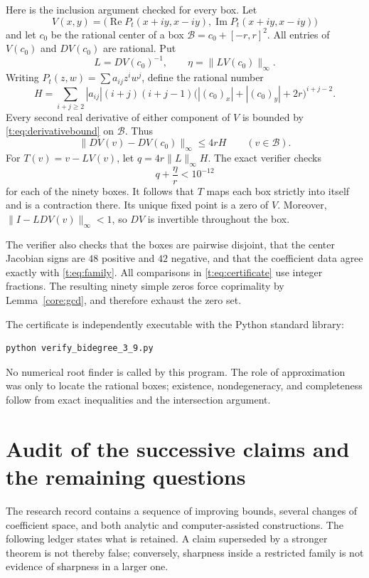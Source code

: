\documentclass[UTF8,11pt]{ctexart}
\theoremstyle{definition}
\numberwithin{equation}{section}
\DeclareMathOperator{\Rea}{Re}\DeclareMathOperator{\Ima}{Im}
\begin{document}
Here is the inclusion argument checked for every box. Let
\[
 V(x,y)=\bigl(\Rea P_t(x+iy,x-iy),\Ima P_t(x+iy,x-iy)\bigr)
\]
and let $c_0$ be the rational center of a box
$\mathcal B=c_0+[-r,r]^2$. All entries of
$V(c_0)$ and $DV(c_0)$ are rational. Put
\[
 L=DV(c_0)^{-1},\qquad
 \eta=\|LV(c_0)\|_\infty.
\]
Writing $P_t(z,w)=\sum a_{ij}z^iw^j$, define the rational number
\begin{equation}\label{t:eq:derivativebound}
 H=\sum_{i+j\ge2}|a_{ij}|(i+j)(i+j-1)
 \bigl(|(c_0)_x|+|(c_0)_y|+2r\bigr)^{i+j-2}.
\end{equation}
Every second real derivative of either component of $V$ is bounded
by \eqref{t:eq:derivativebound} on $\mathcal B$. Thus
\[
 \|DV(v)-DV(c_0)\|_\infty\le4rH\qquad(v\in\mathcal B).
\]
For $T(v)=v-LV(v)$, let $q=4r\|L\|_\infty H$. The exact verifier
checks
\begin{equation}\label{t:eq:certificate}
 q+\frac{\eta}{r}<10^{-12}
\end{equation}
for each of the ninety boxes. It follows that $T$ maps each box
strictly into itself and is a contraction there. Its unique fixed
point is a zero of $V$. Moreover,
$\|I-LDV(v)\|_\infty<1$, so $DV$ is invertible throughout the box.

The verifier also checks that the boxes are pairwise disjoint, that
the center Jacobian signs are $48$ positive and $42$ negative, and
that the coefficient data agree exactly with \eqref{t:eq:family}.
All comparisons in \eqref{t:eq:certificate} use integer fractions.
The resulting ninety simple zeros force coprimality by
Lemma~\ref{core:gcd}, and therefore exhaust the zero set.

The certificate is independently executable with the Python standard
library:
\begin{verbatim}
python verify_bidegree_3_9.py
\end{verbatim}
No numerical root finder is called by this program. The role of
approximation was only to locate the rational boxes; existence,
nondegeneracy, and completeness follow from exact inequalities and
the intersection argument.

\section{Audit of the successive claims and the remaining questions}\label{sec:audit}

The research record contains a sequence of improving bounds, several changes
of coefficient space, and both analytic and computer-assisted constructions.
The following ledger states what is retained. A claim superseded by a
stronger theorem is not thereby false; conversely, sharpness inside a
restricted family is not evidence of sharpness in a larger one.
\end{document}
